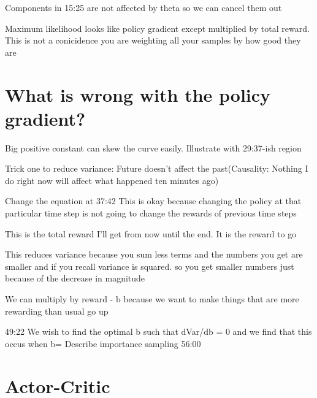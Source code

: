 \documentclass{article}
\begin{document}
Components in 15:25 are not affected by theta so we can cancel them out

Maximum likelihood looks like policy gradient except multiplied by total reward. This is not a conicidence you are weighting all your samples by how good they are 

\section{What is wrong with the policy gradient?}
Big positive constant can skew the curve easily. Illustrate with 29:37-ish region


Trick one to reduce variance: Future doesn't affect the past(Causality: Nothing I do right now will affect what happened ten minutes ago)

Change the equation at 37:42
This is okay because changing the policy at that particular time step is not going to change the rewards of previous time steps

This is the total reward I'll get from now until the end. It is the reward to go

This reduces variance because you sum less terms and the numbers you get are smaller and if you recall variance is squared. so you get smaller numbers just because of the decrease in magnitude

We can multiply by reward - b because we want to make things that are more rewarding than usual go up

49:22
We wish to find the optimal b such that dVar/db = 0 and we find that this occus when b=
Describe importance sampling 56:00

\section{Actor-Critic}

\small


\end{document}
